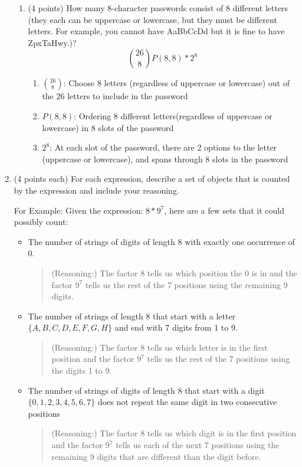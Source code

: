 \documentclass[10pt,letterpaper,unboxed,cm]{article}
\begin{document}
\begin{enumerate}
\begin{enumerate}
\item
(4 points)
How many 8-character passwords consist of 8 different letters (they each can be uppercase or lowercase, but they must be different letters. For example, you cannot have AaBbCcDd but it is fine to have ZpxTaHwy.)?
$$
    \binom{26}{8}P(8, 8) * 2^8
$$
\begin{enumerate}
    \item $\binom{26}{8}$: Choose 8 letters (regardless of uppercase or lowercase) out of the 26 letters to include in the password
    \item $P(8, 8)$: Ordering 8 different letters(regardless of uppercase or lowercase) in 8 slots of the password 
    \item $2^8$: At each slot of the password, there are 2 options to the letter (uppercase or lowercase), and spans through 8 slots in the password
\end{enumerate}
\end{enumerate}

\item (4 points each) For each expression, describe a set of objects that is counted by the expression and include your reasoning.

For Example: Given the expression: $8*9^7$, here are a few sets that it could possibly count:

\begin{itemize}
\item
The number of strings of digits of length 8 with exactly one occurrence of 0.
\begin{quote}
(Reasoning:) The factor $8$ tells us which position the 0 is in and the factor $9^7$ tells us the rest of the 7 positions using the remaining 9 digits.
\end{quote}
\item
The number of strings of length 8 that start with a letter $\{A,B,C,D,E,F,G,H\}$ and end with 7 digits from 1 to 9.
\begin{quote}
(Reasoning:) The factor $8$ tells us which letter is in the first position and the factor $9^7$ tells us the rest of the 7 positions using the digits 1 to 9.
\end{quote}
\item
The number of strings of digits of length 8 that start with a digit $\{0,1,2,3,4,5,6,7\}$ does not repeat the same digit in two consecutive positions
\begin{quote}
(Reasoning:) The factor $8$ tells us which digit is in the first position and the factor $9^7$ tells us each of the next 7 positions using the remaining 9 digits that are different than the digit before.
\end{quote}
\end{itemize}


\end{enumerate}
\end{document}
